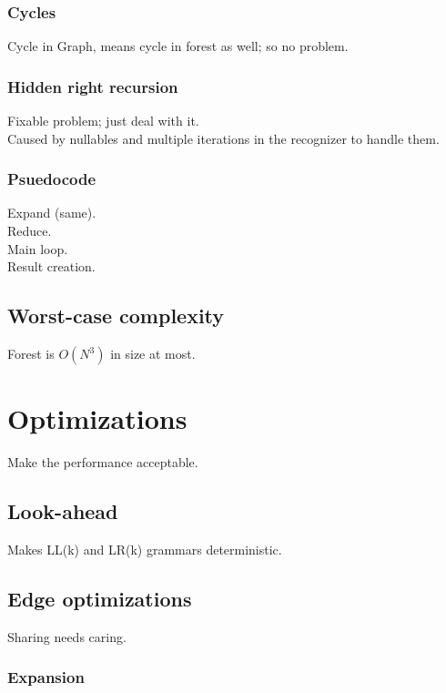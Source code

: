 \documentclass[a4paper,10pt]{article}
\begin{document}
\subsubsection{Cycles}

Cycle in Graph, means cycle in forest as well; so no problem.

\subsubsection{Hidden right recursion}

Fixable problem; just deal with it.\\
Caused by nullables and multiple iterations in the recognizer to handle them.

\subsubsection{Psuedocode}

Expand (same).\\
Reduce.\\
Main loop.\\
Result creation.

\subsection{Worst-case complexity}

Forest is $O(N^3)$ in size at most.

\section{Optimizations}

Make the performance acceptable.

\subsection{Look-ahead}

Makes LL(k) and LR(k) grammars deterministic.

\subsection{Edge optimizations}

Sharing needs caring.

\subsubsection{Expansion}
\end{document}
